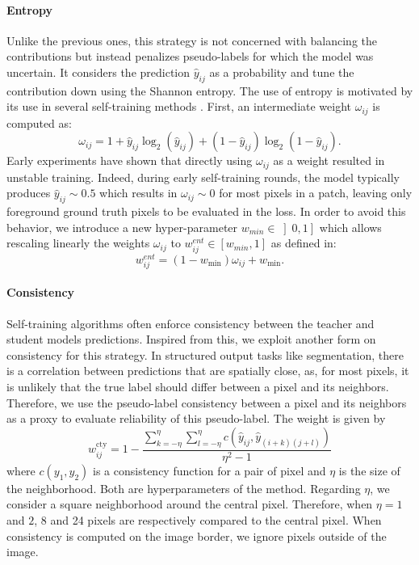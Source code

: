 \paragraph{Entropy} \label{par:strain:entropyweight} Unlike the previous ones, this strategy is not concerned with balancing the contributions but instead penalizes pseudo-labels for which the model was uncertain. It considers the prediction $\hat{y}_{ij}$ as a probability and tune the contribution down using the Shannon entropy. The use of entropy is motivated by its use in several self-training methods \parencite{grandvalet2004semi, lee2013pseudo}. First, an intermediate weight $\omega_{ij}$ is computed as: 
\begin{equation}
\omega_{ij} = 1 + \hat{y}_{ij} \log_2(\hat{y}_{ij}) + (1 - \hat{y}_{ij}) \log_2(1 - \hat{y}_{ij}).
\label{eqn:strain:entropyweight}
\end{equation}
Early experiments have shown that directly using $\omega_{ij}$ as a weight resulted in unstable training. Indeed, during early self-training rounds, the model typically produces $\hat{y}_{ij} \sim 0.5$ which results in $\omega_{ij} \sim 0$ for most pixels in a patch, leaving only foreground ground truth pixels to be evaluated in the loss. In order to avoid this behavior, we introduce a new hyper-parameter $w_{min} \in \left]0, 1\right]$ which allows rescaling linearly the weights $\omega_{ij}$ to $w^{ent}_{ij} \in [w_{min},1]$ as defined in:
\begin{equation}
w^{ent}_{ij} = \left(1 - w_{\text{min}}\right) \omega_{ij} + w_{\text{min}}.
\label{eqn:strain:wminrescale}
\end{equation}

\paragraph{Consistency} Self-training algorithms often enforce consistency between the teacher and student models predictions. Inspired from this, we exploit another form on consistency for this strategy. In structured output tasks like segmentation, there is a correlation between predictions that are spatially close, as, for most pixels, it is unlikely that the true label should differ between a pixel and its neighbors. Therefore, we use the pseudo-label consistency between a pixel and its neighbors as a proxy to evaluate reliability of this pseudo-label. The weight is given by
\begin{equation}
w^{\text{cty}}_{ij} = 1 - \dfrac{\sum_{k=-\eta}^{\eta} \sum_{l=-\eta}^{\eta} c(\hat{y}_{ij},  \hat{y}_{(i+k)(j+l)})}{\eta^2 - 1}
\end{equation}
where $c(y_1,y_2)$ is a consistency function for a pair of pixel and $\eta$ is the size of the neighborhood. Both are hyperparameters of the method. Regarding $\eta$, we consider a square neighborhood around the central pixel. Therefore, when $\eta = 1$ and $2$, 8 and 24 pixels are respectively compared to the central pixel. When consistency is computed on the image border, we ignore pixels outside of the image.

